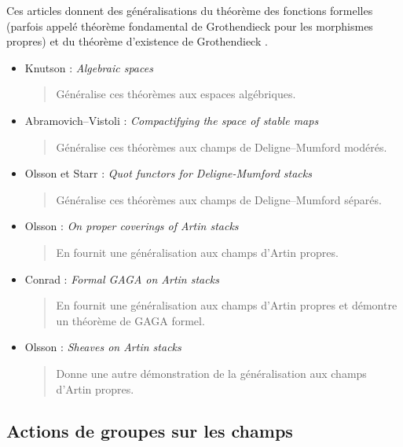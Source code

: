 \noindent
Ces articles donnent des généralisations du théorème des fonctions formelles
\cite[III.4.1.5]{EGA} (parfois appelé théorème fondamental de Grothendieck
pour les morphismes propres) et du théorème d'existence de Grothendieck
\cite[III.5.1.4]{EGA}.
\begin{itemize}
\item Knutson : \emph{Algebraic spaces} \cite[chapitre V]{Kn}
\begin{quote}
Généralise ces théorèmes aux espaces algébriques.
\end{quote}
\item Abramovich--Vistoli : \emph{Compactifying the space of stable maps}
\cite[A.1.1]{abramovich-vistoli}
\begin{quote}
Généralise ces théorèmes aux champs de Deligne--Mumford modérés.
\end{quote}
\item Olsson et Starr : \emph{Quot functors for Deligne-Mumford stacks}
\cite{olsson-starr}
\begin{quote}
Généralise ces théorèmes aux champs de Deligne--Mumford séparés.
\end{quote}
\item Olsson : \emph{On proper coverings of Artin stacks}
\cite{olsson_proper}
\begin{quote}
En fournit une généralisation aux champs d'Artin propres.
\end{quote}
\item Conrad : \emph{Formal GAGA on Artin stacks} \cite{conrad_gaga}
\begin{quote}
En fournit une généralisation aux champs d'Artin propres et démontre un
théorème de GAGA formel.
\end{quote}
\item Olsson : \emph{Sheaves on Artin stacks} \cite{olsson_sheaves}
\begin{quote}
Donne une autre démonstration de la généralisation aux champs d'Artin propres.
\end{quote}
\end{itemize}


\subsection{Actions de groupes sur les champs}
\label{subsection-group-actions}

